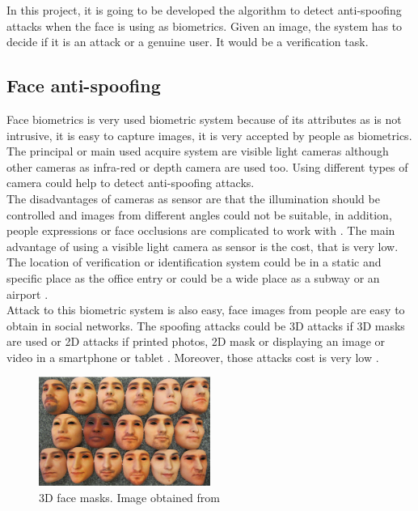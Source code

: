 In this project, it is going to be developed the algorithm to detect anti-spoofing attacks when the face is using as biometrics. Given an image, the system has to decide if it is an attack or a genuine user. It would be a verification task.\\

\subsection{Face anti-spoofing}
Face biometrics is very used biometric system because of its attributes as is not intrusive, it is easy to capture images, it is very accepted by people as biometrics. \\

The principal or main used acquire system are visible light cameras although other cameras as infra-red  or depth camera are used too. Using different types of camera could help to detect anti-spoofing attacks.\\

The disadvantages of cameras as sensor are that the illumination should be controlled and images from different angles could not be suitable, in addition, people expressions or face occlusions are complicated to work with \cite{survey2,2d_3d_face}. The main advantage of using a visible light camera as sensor is the cost, that is very low. \\

The location of verification or identification system could be in a static and specific place as the office entry or could be a wide place as a subway or an airport \cite{survey2}.\\

Attack to this biometric system is also easy, face images from people are easy to obtain in social networks. The spoofing attacks could be 3D attacks if 3D masks are used or 2D attacks if printed photos, 2D mask or displaying an image or video in a smartphone or tablet \cite{2d_3d_face}. Moreover, those attacks cost is very low \cite{distorsion}.\\

\begin{figure}[htb]
\centering
\includegraphics[width=0.5\textwidth]{images_miscelaneus/fig_masks.png}
\caption{3D face masks. Image obtained from \cite{3dmask}} \label{fig:3dMasks}
\end{figure}

